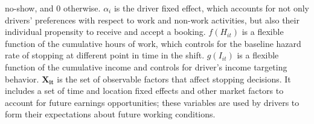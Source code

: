 \documentclass[reviewmode,AEJ]{AEA}
\begin{document}
no-show, and $0$ otherwise. $\alpha_i$ is the driver fixed effect, which accounts for not only drivers' 
preferences with respect to work and non-work activities, but also their individual propensity to receive 
and accept a booking. %
$f(H_{it})$ is a flexible function of the cumulative hours of work, which controls for the baseline 
hazard rate of stopping at different point in time in the shift. $g(I_{it})$ is a flexible function 
of the cumulative income and controls for driver's income targeting behavior. 
$\mathbf{X_{it}}$ is the set of observable factors that affect stopping decisions.  
It includes a set of time and location fixed effects and other market factors to account for 
future earnings opportunities; these variables are used by drivers to form their expectations 
about future working conditions.


\end{document}
